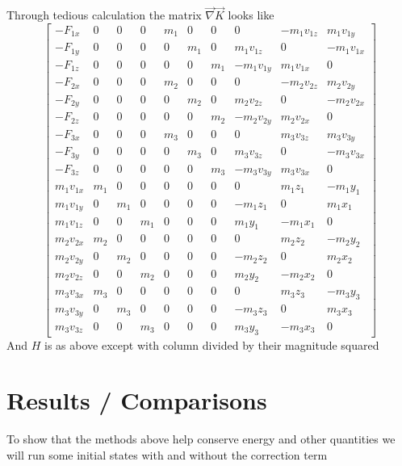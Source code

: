 Through tedious calculation the matrix $\vec{\nabla}\vec{K}$ looks like
\[\left[\begin{array}{cccccccccc}
-F_{1x}  &  0  &  0  &  0  & m_1 &  0  &  0  &  0         & -m_1v_{1z} &  m_1v_{1y} \\
-F_{1y}  &  0  &  0  &  0  &  0  & m_1 &  0  &  m_1v_{1z} &  0         & -m_1v_{1x} \\
-F_{1z}  &  0  &  0  &  0  &  0  &  0  & m_1 & -m_1v_{1y} &  m_1v_{1x} &  0         \\
-F_{2x}  &  0  &  0  &  0  & m_2 &  0  &  0  &  0         & -m_2v_{2z} &  m_2v_{2y} \\
-F_{2y}  &  0  &  0  &  0  &  0  & m_2 &  0  &  m_2v_{2z} &  0         & -m_2v_{2x} \\
-F_{2z}  &  0  &  0  &  0  &  0  &  0  & m_2 & -m_2v_{2y} &  m_2v_{2x} &  0         \\
-F_{3x}  &  0  &  0  &  0  & m_3 &  0  &  0  &  0         &  m_3v_{3z} &  m_3v_{3y} \\
-F_{3y}  &  0  &  0  &  0  &  0  & m_3 &  0  &  m_3v_{3z} &  0         & -m_3v_{3x} \\
-F_{3z}  &  0  &  0  &  0  &  0  &  0  & m_3 & -m_3v_{3y} &  m_3v_{3x} &  0         \\
m_1v_{1x} & m_1 &  0  &  0  &  0  &  0  &  0  &   0        &   m_1z_1   &  -m_1y_1   \\
m_1v_{1y} &  0  & m_1 &  0  &  0  &  0  &  0  &  -m_1z_1   &   0        &   m_1x_1   \\
m_1v_{1z} &  0  &  0  & m_1 &  0  &  0  &  0  &   m_1y_1   &  -m_1x_1   &   0        \\
m_2v_{2x} & m_2 &  0  &  0  &  0  &  0  &  0  &   0        &   m_2z_2   &  -m_2y_2   \\
m_2v_{2y} &  0  & m_2 &  0  &  0  &  0  &  0  &  -m_2z_2   &   0        &   m_2x_2   \\
m_2v_{2z} &  0  &  0  & m_2 &  0  &  0  &  0  &   m_2y_2   &  -m_2x_2   &   0        \\
m_3v_{3x} & m_3 &  0  &  0  &  0  &  0  &  0  &   0        &   m_3z_3   &  -m_3y_3   \\
m_3v_{3y} &  0  & m_3 &  0  &  0  &  0  &  0  &  -m_3z_3   &   0        &   m_3x_3   \\
m_3v_{3z} &  0  &  0  & m_3 &  0  &  0  &  0  &   m_3y_3   &  -m_3x_3   &   0        
\end{array}\right]\]
And $H$ is as above except with column divided by their magnitude squared

\section{Results / Comparisons}
To show that the methods above help conserve energy and other quantities we will run some initial states with and without the correction term\\

